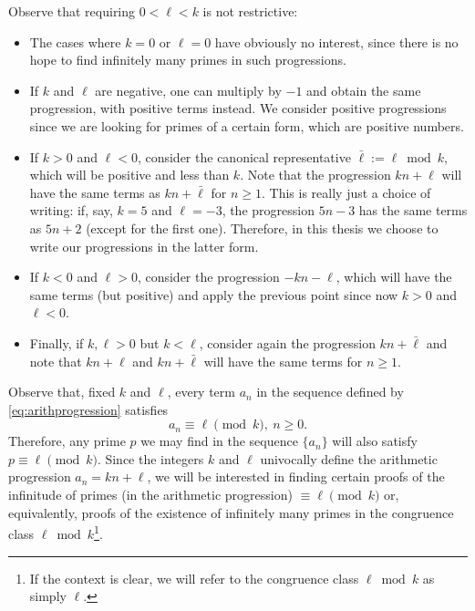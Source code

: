 \documentclass[../main.tex]{subfiles}
\begin{document}
\begin{remark}\label{remark:valuesofkell}
	Observe that requiring $0<\ell<k$ is not restrictive:
\begin{itemize}
	\item The cases where $k=0$ or $\ell=0$ have obviously no interest, since there is no hope to find infinitely many primes in such progressions.
	\item If $k$ and $\ell$ are negative, one can multiply by $-1$ and obtain the same progression, with positive terms instead. We consider positive progressions since we are looking for primes of a certain form, which are positive numbers.
	\item If $k > 0$ and $\ell < 0$, consider the canonical representative $\bar{\ell}:=\ell \bmod{k}$, which will be positive and less than $k$. Note that the progression $kn+\ell$ will have the same terms as $kn+\bar{\ell}$ for $n \geqslant 1$. This is really just a choice of writing: if, say, $k=5$ and $\ell=-3$, the progression $5n-3$ has the same terms as $5n+2$ (except for the first one). Therefore, in this thesis we choose to write our progressions in the latter form.
	\item If $k < 0$ and $\ell > 0$, consider the progression $-kn-\ell$, which will have the same terms (but positive) and apply the previous point since now $k > 0$ and $\ell < 0$.
	\item Finally, if $k,\ell > 0$ but $k < \ell$, consider again the progression $kn+\bar{\ell}$ and note that $kn+\ell$ and $kn+\bar{\ell}$ will have the same terms for $n\geqslant 1$.
\end{itemize}
\end{remark}

Observe that, fixed $k$ and $\ell$, every term $a_n$ in the sequence defined by \cref{eq:arithprogression} satisfies 
\begin{equation*}
	a_n\equiv \ell\pmod{k}, \ n\geqslant 0.
\end{equation*}
Therefore, any prime $p$ we may find in the sequence $\{a_n\}$ will also satisfy $p\equiv \ell\pmod{k}$. Since the integers $k$ and $\ell$ univocally define the arithmetic progression $a_n=kn+\ell$, we will be interested in finding certain proofs of the infinitude of primes (in the arithmetic progression) $\equiv \ell \pmod{k}$ or, equivalently, proofs of the existence of infinitely many primes in the congruence class $\ell \bmod{k}$\footnote{If the context is clear, we will refer to the congruence class $\ell\bmod{k}$ as simply $\ell$.}.
\end{document}
